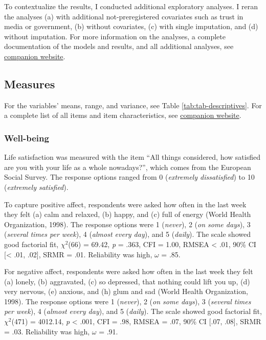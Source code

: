 \documentclass[
  man,mask,floatsintext]{apa7}
\begin{document}
To contextualize the results, I conducted additional exploratory analyses.
I reran the analyses (a) with additional not-preregistered covariates such as trust in media or government, (b) without covariates, (c) with single imputation, and (d) without imputation.
For more information on the analyses, a complete documentation of the models and results, and all additional analyses, see \href{https://XMtRA.github.io/Austrian_Corona_Panel_Project}{companion website}.

\hypertarget{measures}{%
\subsection{Measures}\label{measures}}

For the variables' means, range, and variance, see Table \ref{tab:tab-descriptives}.
For a complete list of all items and item characteristics, see \href{https://XMtRA.github.io/Austrian_Corona_Panel_Project}{companion website}.

\hypertarget{well-being}{%
\subsubsection{Well-being}\label{well-being}}

Life satisfaction was measured with the item ``All things considered, how satisfied are you with your life as a whole nowadays?'', which comes from the European Social Survey.
The response options ranged from 0 (\emph{extremely dissatisfied}) to 10 (\emph{extremely satisfied}).

To capture positive affect, respondents were asked how often in the last week they felt (a) calm and relaxed, (b) happy, and (c) full of energy (World Health Organization, 1998).
The response options were 1 (\emph{never}), 2 (\emph{on some days}), 3 (\emph{several times per week}), 4 (\emph{almost every day}), and 5 (\emph{daily}).
The scale showed good factorial fit, \(\chi^2\)(66) = 69.42, \emph{p} = .363, CFI = 1.00, RMSEA \textless{} .01, 90\% CI {[}\textless{} .01, .02{]}, SRMR = .01.
Reliability was high, \(\omega\) = .85.

For negative affect, respondents were asked how often in the last week they felt (a) lonely, (b) aggravated, (c) so depressed, that nothing could lift you up, (d) very nervous, (e) anxious, and (h) glum and sad (World Health Organization, 1998).
The response options were 1 (\emph{never}), 2 (\emph{on some days}), 3 (\emph{several times per week}), 4 (\emph{almost every day}), and 5 (\emph{daily}).
The scale showed good factorial fit, \(\chi^2\)(471) = 4012.14, \emph{p} \textless{} .001, CFI = .98, RMSEA = .07, 90\% CI {[}.07, .08{]}, SRMR = .03.
Reliability was high, \(\omega\) = .91.
\end{document}
